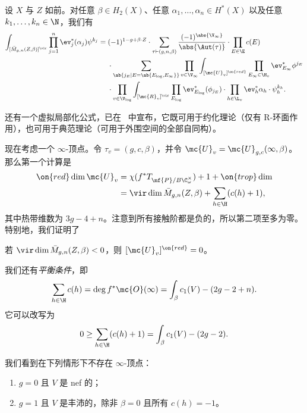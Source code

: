 \begin{thm}
    设 \(X\) 与 \(Z\) 如前。对任意 \(\beta \in H_2(X)\)、任意 \(\alpha_1, \ldots, \alpha_n \in H^*(X)\) 以及任意 \(k_1, \ldots, k_n \in \N\)，我们有
    \begin{align*}
        \int_{[\bar{M}_{g,n}(Z,\beta)]^{\vir}} \prod_{j=1}^n \ev_j^* (\alpha_j) \psi^{k_j}={}& (-1)^{1-g+\beta \cdot Z} \cdot \sum_{\tau \vdash (g,n,\beta)} \frac{(-1)^{\abs{\V_{\infty}}}}{\abs{\Aut(\tau)}} \cdot \prod_{E \in \E} c(E) \\
        & \cdot \sum_{\ab\{j_E \mid E = \ab\{E_{\log}, E_{\infty}\}\}}  \prod_{v \in \V_{\infty}} \int_{[\mc{U}_v]^{\on{red}}} \prod_{E_{\infty} \in \H_v} \ev_{E_{\infty}}^* \phi^{j_E}  \\
        &  \cdot \prod_{v \in \V_{\log}} \int_{[\mc{R}_v]^{\vir}} \prod_{E_{\log}} \ev_{E_{\log}}^* (\phi_{j_E}) \cdot \prod_{h \in \L_v} \ev_h^* \alpha_h \cdot \psi_h^{k_h} .
    \end{align*}
\end{thm}

\begin{rmk}
    还有一个虚拟局部化公式，已在~\cite{CJRlocalization} 中宣布，它既可用于约化理论（仅有 R-环面作用），也可用于典范理论（可用于外围空间的全部自同构）。
\end{rmk}

现在考虑一个 \(\infty\)-顶点。令 \(\tau_v = (g, c, \beta)\)，并令 \(\mc{U}_v = \mc{U}_{g,c}(\infty, \beta)\)。那么第一个计算是
\begin{align*}
    \on{red}\dim \mc{U}_v &= \chi(f^* T_{\mf{P}/B \C^{\times}_{\omega}}) + 1 + \on{trop}\dim  \\
    &= \vir\dim \bar{M}_{g,n}(Z, \beta) + \sum_{h \in \H } (c(h) + 1),
\end{align*}
其中热带维数为 \(3g-4+n\)。注意到所有接触阶都是负的，所以第二项至多为零。特别地，我们证明了
\begin{cor}
    若 \(\vir\dim \bar{M}_{g,n}(Z,\beta) < 0\)，则 \([\mc{U}_v]^{\on{red}} = 0\)。
\end{cor}
我们还有\textit{平衡条件}，即
\begin{equation}\label{eqn:balancing condition}
    \sum_{h \in \H} c(h) = \deg f^* \mc{O}(\infty) = \int_{\beta} c_1(V) - (2g-2+n).
\end{equation}
它可以改写为
\[ 0 \geq \sum_{h \in \H} (c(h)+1) = \int_{\beta} c_1(V) - (2g-2). \]
\begin{prop}
    我们看到在下列情形下不存在 \(\infty\)-顶点：
    \begin{enumerate}
        \item \(g = 0\) 且 \(V\) 是 nef 的；
        \item \(g=1\) 且 \(V\) 是丰沛的，除非 \(\beta = 0\) 且所有 \(c(h) = -1\)。
    \end{enumerate}
\end{prop}

